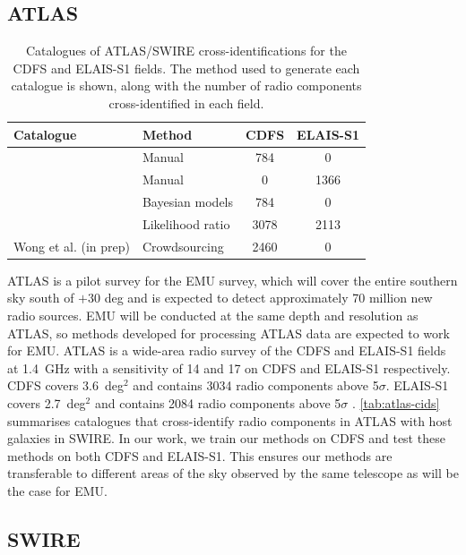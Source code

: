 \documentclass[fleqn,usenatbib,usedcolumn]{mnras}
\newcommand{\jansky}{\text{Jy}}
\begin{document}
  \subsection{ATLAS}\label{sec:atlas}
    \begin{table}
      \caption{Catalogues of ATLAS/SWIRE cross-identifications for the CDFS
        and ELAIS-S1 fields. The method used to generate each catalogue is
        shown, along with the number of radio components cross-identified in each
        field.}
      \label{tab:atlas-cids}
      \begin{tabular}{llcc}
        \hline
        Catalogue & Method & CDFS & ELAIS-S1\\
        \hline
        \citet{norris06} & Manual & 784 & 0\\
        \citet{middelberg08} & Manual & 0 & 1366\\
        \citet{fan15} & Bayesian models & 784 & 0\\
        \citet{weston17} & Likelihood ratio & 3078 & 2113\\
        Wong et al. (in prep) & Crowdsourcing & 2460 & 0 \\
        \hline
      \end{tabular}
    \end{table}

    ATLAS is a pilot survey for the EMU \citep{norris11} survey, which will
    cover the entire southern sky south of $+30$ deg and is expected to
    detect approximately 70 million new radio sources. EMU will be conducted
    at the same depth and resolution as ATLAS, so methods developed for
    processing ATLAS data are expected to work for EMU. ATLAS is a wide-area
    radio survey of the CDFS and ELAIS-S1 fields at 1.4~GHz with a sensitivity
    of 14 and \unit{17}{\micro\jansky} on CDFS and ELAIS-S1 respectively. CDFS
    covers 3.6~deg$^2$ and contains 3034 radio components above 5$\sigma$.
    ELAIS-S1 covers 2.7~deg$^2$ and contains 2084 radio components above
    5$\sigma$ \citep{franzen15}. \autoref{tab:atlas-cids} summarises
    catalogues that cross-identify radio components in ATLAS with host
    galaxies in SWIRE. In our work, we train our methods on CDFS and test these methods on both CDFS and ELAIS-S1.  This ensures our methods are transferable to different areas of the sky observed by the same telescope as will be the case for EMU.

  \subsection{SWIRE}\label{sec:swire}
\end{document}
